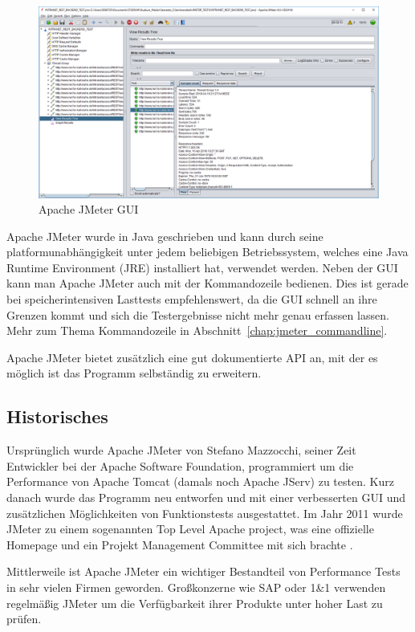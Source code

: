 \documentclass[a4paper,12pt]{article}
\begin{document}
\begin{figure}[htb]%
 \centering
    \includegraphics[width=1\textwidth]{bilder/jmeter_1.png}
  \caption{Apache JMeter GUI}
  \label{fig:jmeter_gui}
\end{figure}
Apache JMeter wurde in Java geschrieben und kann durch seine platformunabhängigkeit unter jedem beliebigen Betriebssystem, welches eine Java Runtime Environment (JRE) installiert hat, verwendet werden. Neben der GUI kann man Apache JMeter auch mit der Kommandozeile bedienen. Dies ist gerade bei speicherintensiven Lasttests empfehlenswert, da die GUI schnell an ihre Grenzen kommt und sich die Testergebnisse nicht mehr genau erfassen lassen. Mehr zum Thema Kommandozeile in Abschnitt~\ref{chap:jmeter_commandline}.

Apache JMeter bietet zusätzlich eine gut dokumentierte API an, mit der es möglich ist das Programm selbständig zu erweitern.

\subsection{Historisches}
Ursprünglich wurde Apache JMeter von Stefano Mazzocchi, seiner Zeit Entwickler bei der Apache Software Foundation, programmiert um die Performance von Apache Tomcat (damals noch Apache JServ) zu testen. Kurz danach wurde das Programm neu entworfen und mit einer verbesserten GUI und zusätzlichen Möglichkeiten von Funktionstests ausgestattet. Im Jahr 2011 wurde JMeter zu einem sogenannten Top Level Apache project, was eine offizielle Homepage und ein Projekt Management Committee mit sich brachte \cite{online:officialJMeter}.

Mittlerweile ist Apache JMeter ein wichtiger Bestandteil von Performance Tests in sehr vielen Firmen geworden. Großkonzerne wie SAP oder 1\&1 verwenden regelmäßig JMeter um die Verfügbarkeit ihrer Produkte unter hoher Last zu prüfen. 
\end{document}
